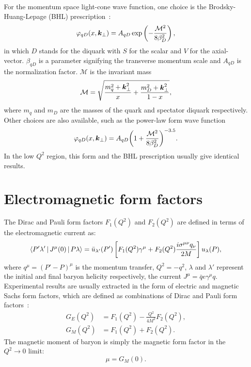 \documentclass[aps,prc,preprint,groupedaddress,showpacs,superscriptaddress,floatfix]{revtex4-1}
\renewcommand{\vec}[1]{\ensuremath\boldsymbol{#1}}
\begin{document}
For the momentum space light-cone wave function, one choice is the Brodsky-Huang-Lepage (BHL) prescription~\cite{brodsky_hadronic_1981}:
%
\begin{equation}
  \varphi_{qD}(x, \vec{k}_\perp) = A_{qD} \exp\left(-\frac{\mathcal{M}^2}{8\beta_{D}^2}  \right),
    \label{eq:mswf_bhl}
\end{equation}
%
in which $D$ stands for the diquark with $S$ for the scalar and $V$ for the axial-vector.
$\beta_{qD}$ is a parameter signifying the transverse momentum scale and $A_{qD}$ is the normalization factor.
$\mathcal{M}$ is the invariant mass
%
\begin{equation}
  \mathcal{M} = \sqrt{\frac{m_q^2+\vec{k}^2_\perp}{x}+\frac{m_D^2+\vec{k}^2_\perp}{1-x}},
  \label{eq:invariant_mass}
\end{equation}
%
where $m_q$ and $m_D$ are the masses of the quark and spectator diquark respectively.
Other choices are also available, such as the power-law form wave function~\cite{brodsky_wave_1994}
%
\begin{equation}
  \varphi_{qD}(x, \vec{k}_\perp) = A_{qD} {\left(1 + \frac{\mathcal{M}^2}{8\beta_{D}^2}\right)}^{-3.5}.
  \label{eq:mswf_pl}
\end{equation}
%
In the low $Q^2$ region, this form and the BHL prescription usually give identical results.

\section{Electromagnetic form factors\label{sec:form_factor}}
The Dirac and Pauli form factors $F_1(Q^2)$ and $F_2(Q^2)$ are defined in terms of the electromagnetic current as:
%
\begin{equation}
  \Braket{P'\lambda'| J^{\mu} (0)| P\lambda} = \bar{u}_{\lambda'}(P') \left[ F_1(Q^2)\gamma^\mu
    + F_2(Q^2) \frac{i\sigma^{\mu\nu}q_\nu}{2M}\right]u_\lambda (P),
    \label{eq:ff_pauli_dirac}
\end{equation}
%
where $q^\mu={(P'-P)}^\mu$ is the momentum transfer, $Q^2=-q^2$, $\lambda$ and $\lambda'$ represent the initial and final baryon helicity respectively, the current $J^\mu = \bar{q}e\gamma^\mu q$.
Experimental results are usually extracted in the form of electric and magnetic Sachs form factors, which are defined as combinations of Dirac and Pauli form factors~\cite{sachs_high-energy_1962}:
%
\begin{align}
  G_E(Q^2) &= F_1(Q^2) - \frac{Q^2}{4M^2} F_2(Q^2), \label{eq:ff_sachs_1}\\
  G_M(Q^2) &= F_1(Q^2) + F_2(Q^2). \label{eq:ff_sachs_2}
\end{align}
%
The magnetic moment of baryon is simply the magnetic form factor in the $Q^2\to 0$ limit:
%
\begin{equation}
  \mu = G_M(0).
  \label{eq:ff_mu}
\end{equation}
%
\end{document}
